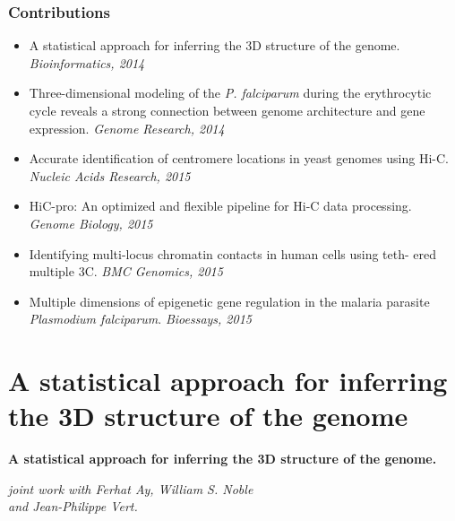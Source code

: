 \documentclass[xcolor=dvipsnames]{beamer}
\begin{document}
\begin{frame}
\frametitle{Contributions}
\begin{itemize}[label={$\bullet$}]
\item<1-> A statistical approach for inferring the 3D structure of the
genome. \textit{Bioinformatics, 2014}
\item<2-> Three-dimensional modeling of the {\em P. falciparum} during the
erythrocytic cycle reveals a strong connection between genome architecture and
gene expression. \textit{Genome Research, 2014}
\item<3-> Accurate identification of centromere locations in yeast genomes using
Hi-C. \textit{Nucleic Acids Research, 2015}
\end{itemize}

\begin{itemize}[label={$\circ$}]
\item<4-> HiC-pro: An optimized and flexible pipeline for Hi-C data
processing. \textit{Genome Biology, 2015}
\item<5-> Identifying multi-locus chromatin contacts in human cells using teth-
ered multiple 3C. \textit{BMC Genomics, 2015}
\item<6-> Multiple dimensions of epigenetic gene regulation in the malaria
parasite {\em Plasmodium falciparum}.
\textit{Bioessays, 2015}
\end{itemize}
\end{frame}


\section{A statistical approach for inferring the 3D structure of the genome}

\begin{frame}
\Large{ \bf
A statistical approach for inferring the 3D structure of the genome.}

\begin{flushright}
\vspace{1em}
\small
\textit{joint work with 
Ferhat Ay, William S. Noble \\ and Jean-Philippe Vert.}
\end{flushright}
\end{frame}
\end{document}
